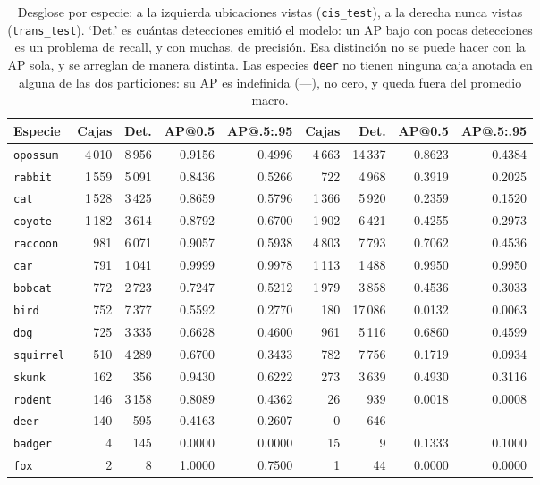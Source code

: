 \begin{table}[t]
  \centering
  \scriptsize
  \begin{tabular}{lrrrr|rrrr}
    \toprule
    Especie & Cajas & Det. & AP@0.5 & AP@.5:.95 & Cajas & Det. & AP@0.5 & AP@.5:.95 \\
    \midrule
    \texttt{opossum} & 4\,010 & 8\,956 & 0.9156 & 0.4996 & 4\,663 & 14\,337 & 0.8623 & 0.4384 \\
    \texttt{rabbit} & 1\,559 & 5\,091 & 0.8436 & 0.5266 & 722 & 4\,968 & 0.3919 & 0.2025 \\
    \texttt{cat} & 1\,528 & 3\,425 & 0.8659 & 0.5796 & 1\,366 & 5\,920 & 0.2359 & 0.1520 \\
    \texttt{coyote} & 1\,182 & 3\,614 & 0.8792 & 0.6700 & 1\,902 & 6\,421 & 0.4255 & 0.2973 \\
    \texttt{raccoon} & 981 & 6\,071 & 0.9057 & 0.5938 & 4\,803 & 7\,793 & 0.7062 & 0.4536 \\
    \texttt{car} & 791 & 1\,041 & 0.9999 & 0.9978 & 1\,113 & 1\,488 & 0.9950 & 0.9950 \\
    \texttt{bobcat} & 772 & 2\,723 & 0.7247 & 0.5212 & 1\,979 & 3\,858 & 0.4536 & 0.3033 \\
    \texttt{bird} & 752 & 7\,377 & 0.5592 & 0.2770 & 180 & 17\,086 & 0.0132 & 0.0063 \\
    \texttt{dog} & 725 & 3\,335 & 0.6628 & 0.4600 & 961 & 5\,116 & 0.6860 & 0.4599 \\
    \texttt{squirrel} & 510 & 4\,289 & 0.6700 & 0.3433 & 782 & 7\,756 & 0.1719 & 0.0934 \\
    \texttt{skunk} & 162 & 356 & 0.9430 & 0.6222 & 273 & 3\,639 & 0.4930 & 0.3116 \\
    \texttt{rodent} & 146 & 3\,158 & 0.8089 & 0.4362 & 26 & 939 & 0.0018 & 0.0008 \\
    \texttt{deer} & 140 & 595 & 0.4163 & 0.2607 & 0 & 646 & --- & --- \\
    \texttt{badger} & 4 & 145 & 0.0000 & 0.0000 & 15 & 9 & 0.1333 & 0.1000 \\
    \texttt{fox} & 2 & 8 & 1.0000 & 0.7500 & 1 & 44 & 0.0000 & 0.0000 \\
    \bottomrule
  \end{tabular}
  \caption{Desglose por especie: a la izquierda ubicaciones vistas (\texttt{cis\_test}), a la derecha nunca vistas (\texttt{trans\_test}). `Det.' es cuántas detecciones emitió el modelo: un AP bajo con pocas detecciones es un problema de recall, y con muchas, de precisión. Esa distinción no se puede hacer con la AP sola, y se arreglan de manera distinta. Las especies \texttt{deer} no tienen ninguna caja anotada en alguna de las dos particiones: su AP es indefinida (---), no cero, y queda fuera del promedio macro.}
  \label{tab:especies}
\end{table}
